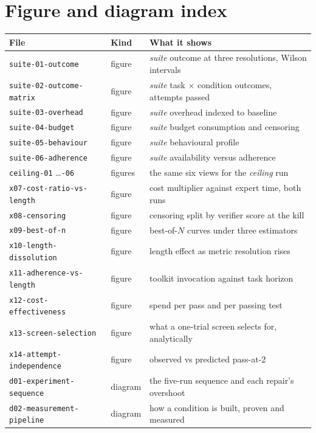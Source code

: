 \documentclass[11pt,a4paper]{article}
\newcommand{\code}[1]{\texttt{\small #1}}
\begin{document}
\clearpage
\section{Figure and diagram index}
\label{app:index}

\begin{center}\footnotesize
\begin{tabular}{@{}llp{8.4cm}@{}}
\toprule
File & Kind & What it shows \\
\midrule
\code{suite-01-outcome} & figure & \emph{suite} outcome at three resolutions, Wilson intervals \\
\code{suite-02-outcome-matrix} & figure & \emph{suite} task $\times$ condition outcomes, attempts passed \\
\code{suite-03-overhead} & figure & \emph{suite} overhead indexed to baseline \\
\code{suite-04-budget} & figure & \emph{suite} budget consumption and censoring \\
\code{suite-05-behaviour} & figure & \emph{suite} behavioural profile \\
\code{suite-06-adherence} & figure & \emph{suite} availability versus adherence \\
\code{ceiling-01} \dots \code{-06} & figures & the same six views for the \emph{ceiling} run \\
\code{x07-cost-ratio-vs-length} & figure & cost multiplier against expert time, both runs \\
\code{x08-censoring} & figure & censoring split by verifier score at the kill \\
\code{x09-best-of-n} & figure & best-of-$N$ curves under three estimators \\
\code{x10-length-dissolution} & figure & length effect as metric resolution rises \\
\code{x11-adherence-vs-length} & figure & toolkit invocation against task horizon \\
\code{x12-cost-effectiveness} & figure & spend per pass and per passing test \\
\code{x13-screen-selection} & figure & what a one-trial screen selects for, analytically \\
\code{x14-attempt-independence} & figure & observed vs predicted pass-at-2 \\
\midrule
\code{d01-experiment-sequence} & diagram & the five-run sequence and each repair's overshoot \\
\code{d02-measurement-pipeline} & diagram & how a condition is built, proven and measured \\

\end{tabular}
\end{center}
\end{document}
